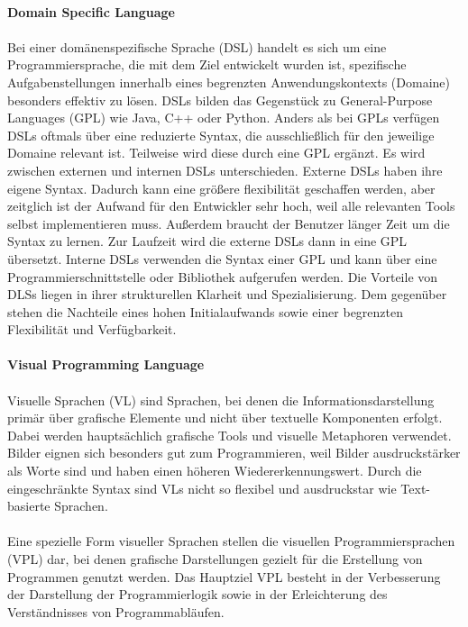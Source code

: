 \documentclass{article}
\begin{document}
    \\
    \textbf{Domain Specific Language}\\
    \\
    Bei einer domänenspezifische Sprache (DSL) handelt es sich um eine Programmiersprache, die mit dem Ziel entwickelt wurden ist, spezifische Aufgabenstellungen innerhalb eines begrenzten Anwendungskontexts (Domaine) besonders effektiv zu lösen. \cite{18}
    DSLs bilden das Gegenstück zu General-Purpose Languages (GPL) wie Java, C++ oder Python. \cite{14}
    Anders als bei GPLs verfügen DSLs oftmals über eine reduzierte Syntax, die ausschließlich für den jeweilige Domaine relevant ist. Teilweise wird diese durch eine GPL ergänzt. \cite{18}
    Es wird zwischen externen und internen DSLs unterschieden. Externe DSLs haben ihre eigene Syntax. Dadurch kann eine größere flexibilität geschaffen werden, aber zeitglich ist der Aufwand für den Entwickler sehr hoch, weil alle relevanten Tools selbst implementieren muss. Außerdem braucht der Benutzer länger Zeit um die Syntax zu lernen. \cite{7}
    Zur Laufzeit wird die externe DSLs dann in eine GPL übersetzt. \cite{14}
    Interne DSLs verwenden die Syntax einer GPL und kann über eine Programmierschnittstelle oder Bibliothek aufgerufen werden. \cite{14}
    Die Vorteile von DLSs liegen in ihrer strukturellen Klarheit und Spezialisierung. Dem gegenüber stehen die Nachteile eines hohen Initialaufwands sowie einer begrenzten Flexibilität und Verfügbarkeit. \cite{18}\\ 
    \\
    \textbf{Visual Programming Language}\\
    \\
    Visuelle Sprachen (VL) sind Sprachen, bei denen die Informationsdarstellung primär über grafische Elemente und nicht über textuelle Komponenten erfolgt. \cite{5}
    Dabei werden hauptsächlich grafische Tools und visuelle Metaphoren verwendet. Bilder eignen sich besonders gut zum Programmieren, weil Bilder ausdruckstärker als Worte sind und haben einen höheren Wiedererkennungswert. Durch die eingeschränkte Syntax sind VLs nicht so flexibel und ausdruckstar wie Text-basierte Sprachen. \cite{16}\\
    \\
    Eine spezielle Form visueller Sprachen stellen die visuellen Programmiersprachen (VPL) dar, bei denen grafische Darstellungen gezielt für die Erstellung von Programmen genutzt werden.    
    Das Hauptziel VPL besteht in der Verbesserung der Darstellung der Programmierlogik sowie in der Erleichterung des Verständnisses von Programmabläufen. \cite{13}
\end{document}
